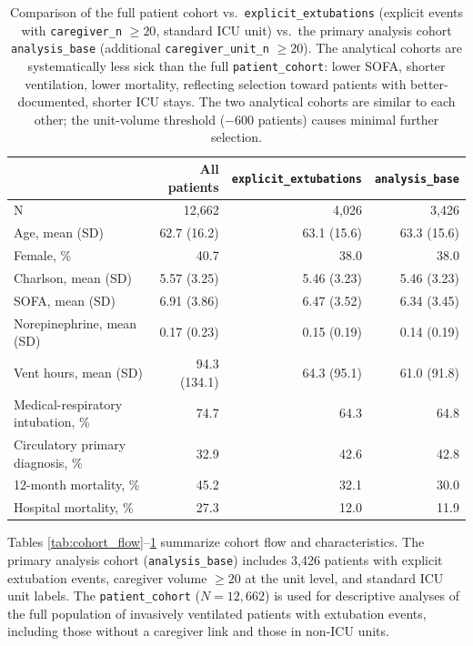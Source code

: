 \documentclass[11pt]{article}
\begin{document}
\begin{table}[h!]
\centering
\begin{tabular}{lrrr}
\toprule
 & All patients & \texttt{explicit\_extubations} & \texttt{analysis\_base}  \\
\midrule
N & 12,662 & 4,026 & 3,426 \\
Age, mean (SD) & 62.7 (16.2) & 63.1 (15.6) & 63.3 (15.6) \\
Female, \% & 40.7 & 38.0 & 38.0 \\
Charlson, mean (SD) & 5.57 (3.25) & 5.46 (3.23) & 5.46 (3.23)  \\
SOFA, mean (SD) & 6.91 (3.86) & 6.47 (3.52) & 6.34 (3.45) \\
Norepinephrine, mean (SD) & 0.17 (0.23) & 0.15 (0.19) & 0.14 (0.19)  \\
Vent hours, mean (SD) & 94.3 (134.1) & 64.3 (95.1) & 61.0 (91.8) \\
Medical-respiratory intubation, \% & 74.7 & 64.3 & 64.8 \\
Circulatory primary diagnosis, \% & 32.9 & 42.6 & 42.8 \\
12-month mortality, \% & 45.2 & 32.1 & 30.0 \\
Hospital mortality, \% & 27.3 & 12.0 & 11.9 \\
\bottomrule
\end{tabular}
\caption{Comparison of the full patient cohort vs.\ \texttt{explicit\_extubations}
(explicit events with \texttt{caregiver\_n} $\geq 20$, standard ICU unit) vs.\ the primary analysis cohort \texttt{analysis\_base} (additional \texttt{caregiver\_unit\_n} $\geq 20$). The analytical cohorts are systematically less sick than the full \texttt{patient\_cohort}: lower SOFA, shorter ventilation, lower mortality, reflecting selection toward patients with better-documented, shorter ICU stays. The two analytical cohorts are similar to each other; the unit-volume threshold
($-600$ patients) causes minimal further selection.}
\label{tab:cohort_comparison}
\end{table}

Tables \ref{tab:cohort_flow}--\ref{tab:cohort_comparison} summarize cohort flow and characteristics. The primary analysis cohort (\texttt{analysis\_base}) includes 3,426 patients with explicit extubation events, caregiver volume $\geq 20$ at the unit level, and standard ICU unit labels. The \texttt{patient\_cohort} ($N=12{,}662$) is used for descriptive analyses of the full population of invasively ventilated patients with extubation events, including those without a caregiver link and those in non-ICU units.
\end{document}
